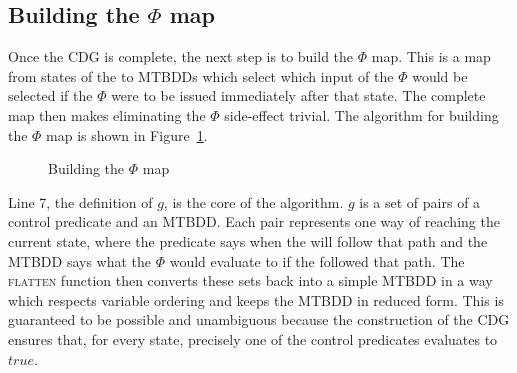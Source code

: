 \subsection{Building the $\Phi$ map}

Once the CDG is complete, the next step is to build the $\Phi$ map.
This is a map from states of the {\StateMachine} to MTBDDs which
select which input of the $\Phi$ would be selected if the $\Phi$ were
to be issued immediately after that state.  The complete map then
makes eliminating the $\Phi$ side-effect trivial.  The algorithm for
building the $\Phi$ map is shown in
Figure~\ref{fig:derive:phi:phi_map}.

\begin{figure}
\begin{algorithmic}[1]
\EndFor
{}
\EndWhile
\end{algorithmic}
\caption{Building the $\Phi$ map}
\label{fig:derive:phi:phi_map}
\end{figure}


Line 7, the definition of $g$, is the core of the algorithm.  $g$ is a
set of pairs of a control predicate and an MTBDD.  Each pair
represents one way of reaching the current state, where the predicate
says when the {\StateMachine} will follow that path and the MTBDD says
what the $\Phi$ would evaluate to if the {\StateMachine} followed that
path.  The \textsc{flatten} function then converts these sets back
into a simple MTBDD in a way which respects variable ordering and
keeps the MTBDD in reduced form.  This is guaranteed to be possible
and unambiguous because the construction of the CDG ensures that, for
every state, precisely one of the control predicates evaluates to
$\mathit{true}$.



